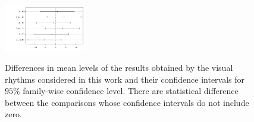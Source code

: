 \documentclass[journal]{IEEEtran}
\begin{document}
%
\begin{figure}[!h]
\centering
\includegraphics[width=0.32\textwidth]{figure-10.pdf}\\
\caption{{Differences in mean levels of the results obtained by the visual rhythms considered in this work and their confidence intervals for $95\%$ family-wise confidence level. There are statistical difference between the comparisons whose confidence intervals do not include zero.}}
\label{fig:visualrhythmstats}
\end{figure}
%
%
\end{document}
